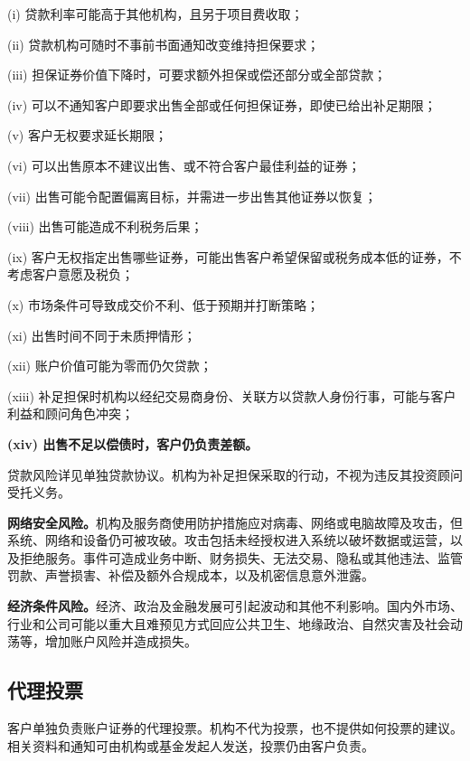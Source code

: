 \documentclass[UTF8,fontset=none,11pt,a4paper]{ctexart}
\begin{document}
(i) 贷款利率可能高于其他机构，且另于项\allowbreak\mbox{目费收取；}


(ii) 贷款机构可随时不事前书面通知改变维持\allowbreak\mbox{担保要求；}


(iii) 担保证券价值下降时，可要求额外担保或偿还部分或\allowbreak\mbox{全部贷款；}


(iv) 可以不通知客户即要求出售全部或任何担保证券，即使已给出\allowbreak\mbox{补足期限；}


(v) 客户无权要求\allowbreak\mbox{延长期限；}


(vi) 可以出售原本不建议出售、或不符合客户最佳利\allowbreak\mbox{益的证券；}


(vii) 出售可能令配置偏离目标，并需进一步出售其他证\allowbreak\mbox{券以恢复；}


(viii) 出售可能造成不利\allowbreak\mbox{税务后果；}


(ix) 客户无权指定出售哪些证券，可能出售客户希望保留或税务成本低的证券，不考虑客户意\allowbreak\mbox{愿及税负；}


(x) 市场条件可导致成交价不利、低于预期并\allowbreak\mbox{打断策略；}


(xi) 出售时间不同于未\allowbreak\mbox{质押情形；}


(xii) 账户价值可能为零而\allowbreak\mbox{仍欠贷款；}


(xiii) 补足担保时机构以经纪交易商身份、关联方以贷款人身份行事，可能与客户利益和顾问\allowbreak\mbox{角色冲突；}


\textbf{(xiv) 出售不足以偿债时，客户仍负责差额。}


贷款风险详见单独贷款协议。机构为补足担保采取的行动，不视为违反其投资顾问\allowbreak\mbox{受托义务。}


\textbf{网络安全风险。}机构及服务商使用防护措施应对病毒、网络或电脑故障及攻击，但系统、网络和设备仍可被攻破。攻击包括未经授权进入系统以破坏数据或运营，以及拒绝服务。事件可造成业务中断、财务损失、无法交易、隐私或其他违法、监管罚款、声誉损害、补偿及额外合规成本，以及机密信息\allowbreak\mbox{意外泄露。}


\textbf{经济条件风险。}经济、政治及金融发展可引起波动和其他不利影响。国内外市场、行业和公司可能以重大且难预见方式回应公共卫生、地缘政治、自然灾害及社会动荡等，增加账户风险并\allowbreak\mbox{造成损失。}


\subsection*{代理投票}
客户单独负责账户证券的代理投票。机构不代为投票，也不提供如何投票的建议。相关资料和通知可由机构或基金发起人发送，投票仍由\allowbreak\mbox{客户负责。}
\end{document}
